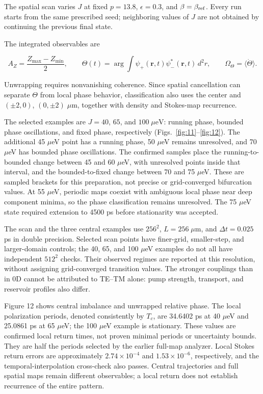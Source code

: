 \documentclass[12pt,a4paper]{article}
\begin{document}
The spatial scan varies \(J\) at fixed \(p=13.8\), \(\epsilon=0.3\), and \(\beta=\beta_{\rm ref}\). Every run starts from the same prescribed seed; neighboring values of \(J\) are not obtained by continuing the previous final state.

The integrated observables are

\[
A_Z=\frac{Z_{\max}-Z_{\min}}{2},\qquad
\Theta(t)=\arg\!\int\psi_+(\mathbf r,t)\psi_-^*(\mathbf r,t)\,d^2r,
\qquad \Omega_\Theta=\langle\dot\Theta\rangle.
\tag{21}\label{eq:21}
\]

Unwrapping requires nonvanishing coherence. Since spatial cancellation can separate \(\Theta\) from local phase behavior, classification also uses the center and \((\pm2,0)\), \((0,\pm2)\;\mu\mathrm m\), together with density and Stokes-map recurrence.

The selected examples are \(J=40\), \(65\), and \(100\;\mu\mathrm{eV}\): running phase, bounded phase oscillations, and fixed phase, respectively (Figs.~\ref{fig:11}--\ref{fig:12}). The additional 45 \ensuremath{\mu}eV point has a running phase, 50 \ensuremath{\mu}eV remains unresolved, and 70 \ensuremath{\mu}eV has bounded phase oscillations. The confirmed samples place the running-to-bounded change between 45 and 60 \ensuremath{\mu}eV, with unresolved points inside that interval, and the bounded-to-fixed change between 70 and 75 \ensuremath{\mu}eV. These are sampled brackets for this preparation, not precise or grid-converged bifurcation values. At 55 \ensuremath{\mu}eV, periodic maps coexist with ambiguous local phase near deep component minima, so the phase classification remains unresolved. The 75 \ensuremath{\mu}eV state required extension to 4500 ps before stationarity was accepted.

The scan and the three central examples use \(256^2\), \(L=256\;\mu\mathrm m\), and \(\Delta t=0.025\) ps in double precision. Selected scan points have finer-grid, smaller-step, and larger-domain controls; the 40, 65, and 100 \ensuremath{\mu}eV examples do not all have independent \(512^2\) checks. Their observed regimes are reported at this resolution, without assigning grid-converged transition values. The stronger couplings than in 0D cannot be attributed to TE--TM alone: pump strength, transport, and reservoir profiles also differ.

Figure 12 shows central imbalance and unwrapped relative phase. The local polarization periods, denoted consistently by \(T_c\), are 34.6402 ps at 40 \ensuremath{\mu}eV and 25.0861 ps at 65 \ensuremath{\mu}eV; the 100 \ensuremath{\mu}eV example is stationary. These values are confirmed local return times, not proven minimal periods or uncertainty bounds. They are half the periods selected by the earlier full-map analyzer. Local Stokes return errors are approximately \(2.74\times10^{-4}\) and \(1.53\times10^{-6}\), respectively, and the temporal-interpolation cross-check also passes. Central trajectories and full spatial maps remain different observables; a local return does not establish recurrence of the entire pattern.
\end{document}
